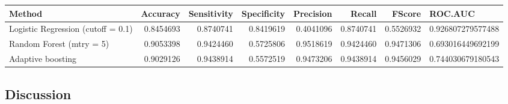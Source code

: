 \documentclass[
]{article}
\newenvironment{Shaded}{\begin{snugshade}}{\end{snugshade}}
\newcommand{\DataTypeTok}[1]{\textcolor[rgb]{0.13,0.29,0.53}{#1}}
\newcommand{\DecValTok}[1]{\textcolor[rgb]{0.00,0.00,0.81}{#1}}
\newcommand{\KeywordTok}[1]{\textcolor[rgb]{0.13,0.29,0.53}{\textbf{#1}}}
\newcommand{\NormalTok}[1]{#1}
\newcommand{\OperatorTok}[1]{\textcolor[rgb]{0.81,0.36,0.00}{\textbf{#1}}}
\newcommand{\StringTok}[1]{\textcolor[rgb]{0.31,0.60,0.02}{#1}}
\begin{document}
\begin{Shaded}
\end{Shaded}

\begin{table}[H]
\centering
\begin{tabular}{l|r|r|r|r|r|r|l}
\hline
Method & Accuracy & Sensitivity & Specificity & Precision & Recall & FScore & ROC.AUC\\
\hline
Logistic Regression (cutoff = 0.1) & 0.8454693 & 0.8740741 & 0.8419619 & 0.4041096 & 0.8740741 & 0.5526932 & 0.926807279577488\\
\hline
Random Forest (mtry = 5) & 0.9053398 & 0.9424460 & 0.5725806 & 0.9518619 & 0.9424460 & 0.9471306 & 0.693016449692199\\
\hline
Adaptive boosting & 0.9029126 & 0.9438914 & 0.5572519 & 0.9473206 & 0.9438914 & 0.9456029 & 0.744030679180543\\
\hline
\end{tabular}
\end{table}

\hypertarget{discussion}{%
\subsection{Discussion}\label{discussion}}
\end{document}
